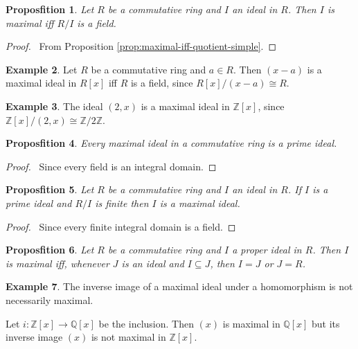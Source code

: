 \documentclass{book}
\let\qed\relax
\newtheorem{prop}{Proposfition}[chapter]
\theoremstyle{definition}
\newtheorem{ex}[prop]{Example}
\begin{document}
\begin{prop}
Let $R$ be a commutative ring and $I$ an ideal in $R$. Then $I$ is maximal iff $R/I$ is a field.
\end{prop}

\begin{proof}
\pf\ From Proposition \ref{prop:maximal-iff-quotient-simple}. \qed
\end{proof}

\begin{ex}
\label{ex:x-minus-a-maximal}
Let $R$ be a commutative ring and $a \in R$. Then $(x-a)$ is a maximal ideal in $R[x]$ iff $R$ is a field, since $R[x]/(x-a) \cong R$.
\end{ex}

\begin{ex}
The ideal $(2,x)$ is a maximal ideal in $\mathbb{Z}[x]$, since $\mathbb{Z}[x] / (2,x) \cong \mathbb{Z} / 2 \mathbb{Z}$.
\end{ex}

\begin{prop}
Every maximal ideal in a commutative ring is a prime ideal.
\end{prop}

\begin{proof}
\pf\ Since every field is an integral domain. \qed
\end{proof}

\begin{prop}
Let $R$ be a commutative ring and $I$ an ideal in $R$. If $I$ is a prime ideal and $R/I$ is finite then $I$ is a maximal ideal.
\end{prop}

\begin{proof}
\pf\ Since every finite integral domain is a field. \qed
\end{proof}

\begin{prop}
Let $R$ be a commutative ring and $I$ a proper ideal in $R$. Then $I$ is maximal iff, whenever $J$ is an ideal and $I \subseteq J$, then $I = J$ or $J = R$.
\end{prop}


\begin{ex}
The inverse image of a maximal ideal under a homomorphism is not necessarily maximal.

Let $i : \mathbb{Z}[x] \rightarrow \mathbb{Q}[x]$ be the inclusion. Then $(x)$ is maximal in $\mathbb{Q}[x]$ but its inverse image $(x)$ is not maximal in $\mathbb{Z}[x]$.
\end{ex}
\end{document}
